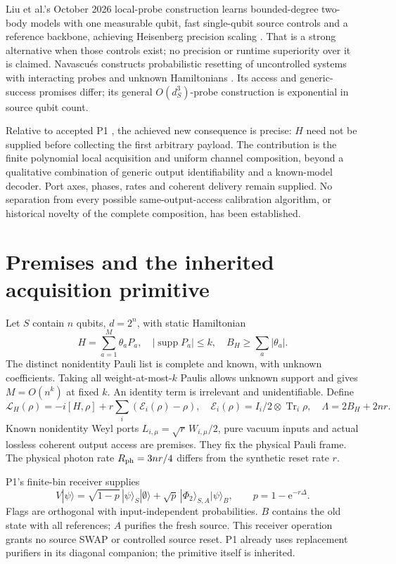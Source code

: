 \documentclass[11pt]{article}
\newcommand{\Tr}{\operatorname{Tr}}
\newcommand{\supp}{\operatorname{supp}}
\newcommand{\cL}{\mathcal L}
\newcommand{\cE}{\mathcal E}
\newcommand{\ee}{\mathrm e}
\begin{document}
Liu et al.'s October 2026 local-probe construction learns bounded-degree two-body models with one measurable qubit, fast single-qubit source controls and a reference backbone, achieving Heisenberg precision scaling \cite{liu}. That is a strong alternative when those controls exist; no precision or runtime superiority over it is claimed. Navascu\'es constructs probabilistic resetting of uncontrolled systems with interacting probes and unknown Hamiltonians \cite{navascues}. Its access and generic-success promises differ; its general \(O(d_S^3)\)-probe construction is exponential in source qubit count.

Relative to accepted P1 \cite{p1}, the achieved new consequence is precise: \(H\) need not be supplied before collecting the first arbitrary payload. The contribution is the finite polynomial local acquisition and uniform channel composition, beyond a qualitative combination of generic output identifiability and a known-model decoder. Port axes, phases, rates and coherent delivery remain supplied. No separation from every possible same-output-access calibration algorithm, or historical novelty of the complete composition, has been established.

\section{Premises and the inherited acquisition primitive}
Let \(S\) contain \(n\) qubits, \(d=2^n\), with static Hamiltonian
\[
H=\sum_{a=1}^{M}\theta_aP_a,\quad |\supp P_a|\le k,\quad B_H\ge\sum_a|\theta_a|.
\]
The distinct nonidentity Pauli list is complete and known, with unknown coefficients. Taking all weight-at-most-\(k\) Paulis allows unknown support and gives \(M=O(n^k)\) at fixed \(k\). An identity term is irrelevant and unidentifiable. Define
\[
\cL_H(\rho)=-i[H,\rho]+r\sum_i(\cE_i(\rho)-\rho),\quad
\cE_i(\rho)=I_i/2\otimes\Tr_i\rho,\quad \Lambda=2B_H+2nr.
\]
Known nonidentity Weyl ports \(L_{i,\mu}=\sqrt r\,W_{i,\mu}/2\), pure vacuum inputs and actual lossless coherent output access are premises. They fix the physical Pauli frame. The physical photon rate \(R_{\rm ph}=3nr/4\) differs from the synthetic reset rate \(r\).

P1's finite-bin receiver supplies
\begin{equation}
V|\psi\rangle=\sqrt{1-p}\,|\psi\rangle_S|\emptyset\rangle
+\sqrt p\,|\Phi_2\rangle_{S,A}|\psi\rangle_B,\qquad p=1-\ee^{-r\Delta}.
\label{eq:primitive}
\end{equation}
Flags are orthogonal with input-independent probabilities. \(B\) contains the old state with all references; \(A\) purifies the fresh source. This receiver operation grants no source SWAP or controlled source reset. P1 already uses replacement purifiers in its diagonal companion; the primitive itself is inherited.
\end{document}
